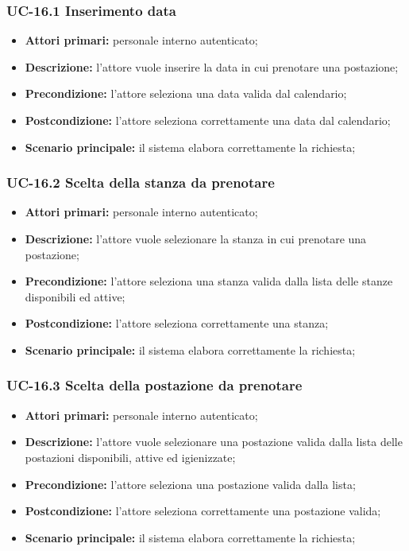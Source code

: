 \subsubsection{UC-16.1 Inserimento data}

\begin{itemize}
\item \textbf{Attori primari:} personale interno autenticato;
\item \textbf{Descrizione:} l'attore vuole inserire la data in cui prenotare una postazione;
\item \textbf{Precondizione:} l'attore seleziona una data valida dal calendario;
\item \textbf{Postcondizione:} l'attore seleziona correttamente una data dal calendario;
\item \textbf{Scenario principale:} il sistema elabora correttamente la richiesta;
\end{itemize}

\subsubsection{UC-16.2 Scelta della stanza da prenotare}

\begin{itemize}
\item \textbf{Attori primari:} personale interno autenticato;
\item \textbf{Descrizione:} l'attore vuole selezionare la stanza in cui prenotare una postazione;
\item \textbf{Precondizione:} l'attore seleziona una stanza valida dalla lista delle stanze disponibili ed attive;
\item \textbf{Postcondizione:} l'attore seleziona correttamente una stanza;
\item \textbf{Scenario principale:} il sistema elabora correttamente la richiesta;
\end{itemize}

\subsubsection{UC-16.3 Scelta della postazione da prenotare}

\begin{itemize}
\item \textbf{Attori primari:} personale interno autenticato;
\item \textbf{Descrizione:} l'attore vuole selezionare una postazione valida dalla lista delle postazioni disponibili, attive ed igienizzate;
\item \textbf{Precondizione:} l'attore seleziona una postazione valida dalla lista;
\item \textbf{Postcondizione:} l'attore seleziona correttamente una postazione valida;
\item \textbf{Scenario principale:} il sistema elabora correttamente la richiesta;
\end{itemize}

